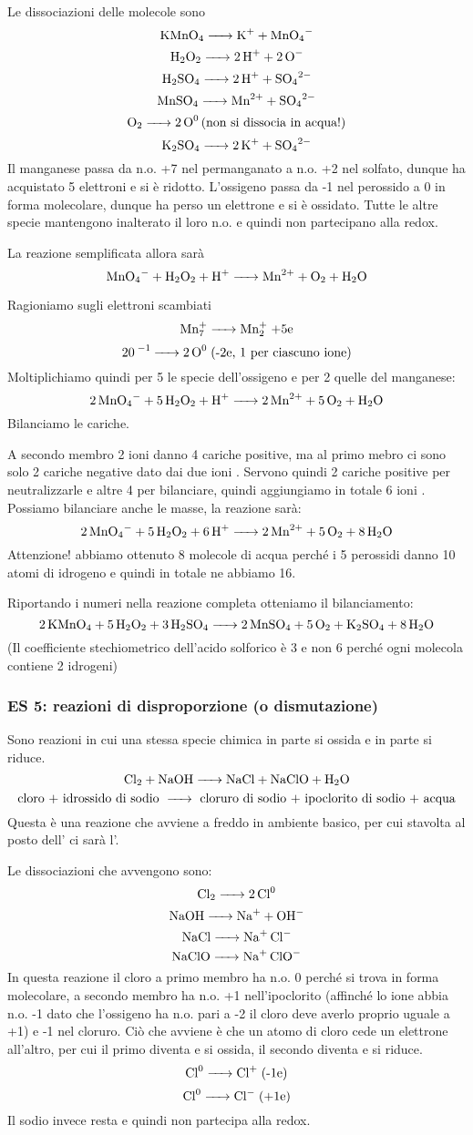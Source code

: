 Le dissociazioni delle molecole sono
$$\ce{KMnO_4 -> K+ + MnO_4-}$$
$$\ce{H_2O_2 -> 2H+ + 2O-}$$
$$\ce{H_2SO_4 -> 2H+ + SO_4^2-}$$
$$\ce{MnSO_4 -> Mn^2+ + SO_4^2-}$$
$$\ce{O_2 -> 2O^0 \text{(non si dissocia in acqua!)}}$$
$$\ce{K_2SO_4 -> 2K+ + SO_4^2-}$$
Il manganese passa da n.o. +7 nel permanganato a n.o. +2 nel solfato, dunque ha acquistato 5 elettroni e si è ridotto. L'ossigeno passa da -1 nel perossido a 0 in forma molecolare, dunque ha perso un elettrone e si è ossidato. Tutte le altre specie mantengono inalterato il loro n.o. e quindi non partecipano alla redox.

La reazione semplificata allora sarà
$$\ce{MnO_4- + H_2O_2 + H+ -> Mn^2+ + O_2 + H_2O}$$

Ragioniamo sugli elettroni scambiati
$$\ce{Mn^+7 -> Mn^+2} \; \text{+5e}$$
$$\ce{20^-1 -> 2O^0} \; \text{(-2e, 1 per ciascuno ione)}$$
Moltiplichiamo quindi per 5 le specie dell'ossigeno e per 2 quelle del manganese:
$$\ce{2MnO_4- + 5H_2O_2 + H+ -> 2Mn^2+ + 5O_2 + H_2O}$$
Bilanciamo le cariche.

A secondo membro 2 ioni  danno 4 cariche positive, ma al primo mebro ci sono solo 2 cariche negative dato dai due ioni . Servono quindi 2 cariche positive per neutralizzarle e altre 4 per bilanciare, quindi aggiungiamo in totale 6 ioni . Possiamo bilanciare anche le masse, la reazione sarà:
$$\ce{2MnO_4- + 5H_2O_2 + 6H+ -> 2Mn^2+ + 5O_2 + 8H_2O}$$
Attenzione! abbiamo ottenuto 8 molecole di acqua perché i 5 perossidi danno 10 atomi di idrogeno e quindi in totale ne abbiamo 16.

Riportando i numeri nella reazione completa otteniamo il bilanciamento:
$$\ce{2KMnO_4 + 5H_2O_2 + 3H_2SO_4 -> 2MnSO_4 + 5O_2 + K_2SO_4 + 8H_2O}$$
(Il coefficiente stechiometrico dell'acido solforico è 3 e non 6 perché ogni molecola contiene 2 idrogeni)\\
\subsubsection{\textbf{ES 5: reazioni di disproporzione (o dismutazione)}}

Sono reazioni in cui una stessa specie chimica in parte si ossida e in parte si riduce.
$$\ce{Cl_2 + NaOH -> NaCl + NaClO + H_2O}$$
$$\text{cloro + idrossido di sodio \ce{->} cloruro di sodio + ipoclorito di sodio + acqua}$$
Questa è una reazione che avviene a freddo in ambiente basico, per cui stavolta al posto dell' ci sarà l'.

Le dissociazioni che avvengono sono:
$$\ce{Cl_2 -> 2Cl^0}$$
$$\ce{NaOH -> Na+ + OH-}$$
$$\ce{NaCl -> Na+ Cl-}$$
$$\ce{NaClO -> Na+ ClO-}$$
In questa reazione il cloro a primo membro ha n.o. 0 perché si trova in forma molecolare, a secondo membro ha n.o. +1 nell'ipoclorito (affinché lo ione  abbia n.o. -1 dato che l'ossigeno ha n.o. pari a -2 il cloro deve averlo proprio uguale a +1) e -1 nel cloruro. Ciò che avviene è che un atomo di cloro cede un elettrone all'altro, per cui il primo diventa  e si ossida, il secondo diventa  e si riduce.
$$\ce{Cl^0 -> Cl+} \; \text{(-1e)}$$
$$\ce{Cl^0 ->Cl-} \; \text{(+1e)}$$
Il sodio invece resta  e quindi non partecipa alla redox.

